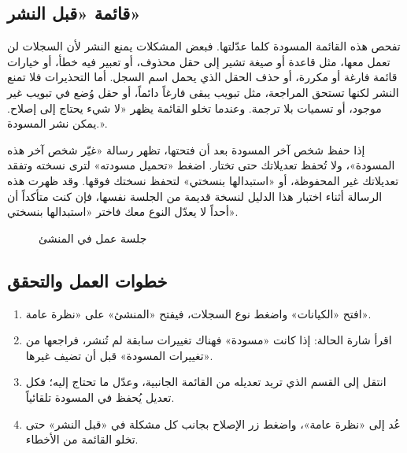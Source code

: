 \subsection{قائمة «قبل النشر»}

تفحص هذه القائمة المسودة كلما عدّلتها. فبعض المشكلات يمنع النشر لأن السجلات لن تعمل معها، مثل قاعدة أو صيغة تشير إلى حقل محذوف، أو تعبير فيه خطأ، أو خيارات قائمة فارغة أو مكررة، أو حذف الحقل الذي يحمل اسم السجل. أما التحذيرات فلا تمنع النشر لكنها تستحق المراجعة، مثل تبويب يبقى فارغاً دائماً، أو حقل وُضع في تبويب غير موجود، أو تسميات بلا ترجمة. وعندما تخلو القائمة يظهر «لا شيء يحتاج إلى إصلاح. يمكن نشر المسودة.».

\begin{rcwarn}
إذا حفظ شخص آخر المسودة بعد أن فتحتها، تظهر رسالة «غيّر شخص آخر هذه المسودة»، ولا تُحفظ تعديلاتك حتى تختار. اضغط «تحميل مسودته» لترى نسخته وتفقد تعديلاتك غير المحفوظة، أو «استبدالها بنسختي» لتحفظ نسختك فوقها. وقد ظهرت هذه الرسالة أثناء اختبار هذا الدليل لنسخة قديمة من الجلسة نفسها، فإن كنت متأكداً أن أحداً لا يعدّل النوع معك فاختر «استبدالها بنسختي».
\end{rcwarn}

\begin{figure}[H]
\centering
{}
\rclegend
\caption{جلسة عمل في المنشئ}
\label{fig:builder-workspace-flow}
\end{figure}

\subsection{خطوات العمل والتحقق}
\begin{enumerate}
\item افتح «الكيانات» واضغط نوع السجلات، فيفتح «المنشئ» على «نظرة عامة».
\item اقرأ شارة الحالة: إذا كانت «مسودة» فهناك تغييرات سابقة لم تُنشر، فراجعها من «تغييرات المسودة» قبل أن تضيف غيرها.
\item انتقل إلى القسم الذي تريد تعديله من القائمة الجانبية، وعدّل ما تحتاج إليه؛ فكل تعديل يُحفظ في المسودة تلقائياً.
\item عُد إلى «نظرة عامة»، واضغط زر الإصلاح بجانب كل مشكلة في «قبل النشر» حتى تخلو القائمة من الأخطاء.
\end{enumerate}

